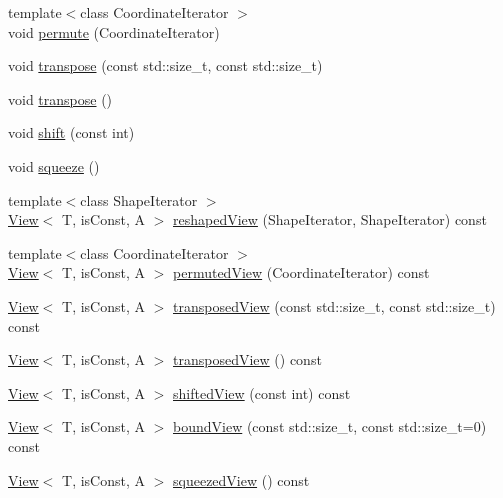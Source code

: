\begin{DoxyCompactItemize}
\item 
{\footnotesize template$<$class Coordinate\+Iterator $>$ }\\void \hyperlink{classandres_1_1View_a375d3e199e219568d8a6205e4088289b}{permute} (Coordinate\+Iterator)
\item 
void \hyperlink{classandres_1_1View_a3a837dd20fda8c536f9c76894a1f5944}{transpose} (const std\+::size\+\_\+t, const std\+::size\+\_\+t)
\item 
void \hyperlink{classandres_1_1View_ad7acad354a5be4086b9b21ab88b18d82}{transpose} ()
\item 
void \hyperlink{classandres_1_1View_a476957393b3b21333bc665e852da47ad}{shift} (const int)
\item 
void \hyperlink{classandres_1_1View_a922763728fb80d24c32a5e5964537bdb}{squeeze} ()
\item 
{\footnotesize template$<$class Shape\+Iterator $>$ }\\\hyperlink{classandres_1_1View}{View}$<$ T, is\+Const, A $>$ \hyperlink{classandres_1_1View_a7d399d00c3f90eb3e2d928812ef24ec6}{reshaped\+View} (Shape\+Iterator, Shape\+Iterator) const
\item 
{\footnotesize template$<$class Coordinate\+Iterator $>$ }\\\hyperlink{classandres_1_1View}{View}$<$ T, is\+Const, A $>$ \hyperlink{classandres_1_1View_ad5ff9254de815d85b6c6748bad3fcd89}{permuted\+View} (Coordinate\+Iterator) const
\item 
\hyperlink{classandres_1_1View}{View}$<$ T, is\+Const, A $>$ \hyperlink{classandres_1_1View_a98a4c17bd2faa51788f6fd533a429e73}{transposed\+View} (const std\+::size\+\_\+t, const std\+::size\+\_\+t) const
\item 
\hyperlink{classandres_1_1View}{View}$<$ T, is\+Const, A $>$ \hyperlink{classandres_1_1View_a02ed325250a7feedb41ab3531da39841}{transposed\+View} () const
\item 
\hyperlink{classandres_1_1View}{View}$<$ T, is\+Const, A $>$ \hyperlink{classandres_1_1View_abc938823dc964548f0f44ab10bca6b59}{shifted\+View} (const int) const
\item 
\hyperlink{classandres_1_1View}{View}$<$ T, is\+Const, A $>$ \hyperlink{classandres_1_1View_afedd24824bbb3ada02cb5344468d8bb8}{bound\+View} (const std\+::size\+\_\+t, const std\+::size\+\_\+t=0) const
\item 
\hyperlink{classandres_1_1View}{View}$<$ T, is\+Const, A $>$ \hyperlink{classandres_1_1View_ab7dc15479fe9bb3eb533564598d30341}{squeezed\+View} () const
\item 

\end{DoxyCompactItemize}
